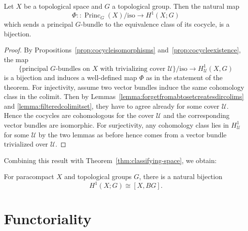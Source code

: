 \documentclass[a4paper,openany]{scrbook}
\DeclareMathOperator{\Princ}{Princ}
\begin{document}
\begin{thm}\label{thm:principalbundlesbycechcohomology}
Let $X$ be a topological space and $G$ a topological group. Then the natural map
\[
\Phi\colon\colon \Princ_G(X)/\text{iso} \to H^1(X;G)
\]
which sends a principal $G$-bundle to the equivalence class of its cocycle, is a bijection.
\end{thm}
\begin{proof}
By Propositions~\ref{prop:cocycleisomorphisms} and~\ref{prop:cocycleexistence}, the map
\[
\{\text{principal $G$-bundles on $X$ with trivializing cover $\mathcal U$}\}/\text{iso} \to H_\mathcal U^1(X,G)
\]
is a bijection and induces a well-defined map $\Phi$ as in the statement of the theorem. For injectivity, assume two vector bundles induce the same cohomology class in the colimit. Then by Lemmas~\ref{lemma:forgetfromabtosetcreatesdircolims} and \ref{lemma:filteredcolimitset}, they have to agree already for some cover $\mathcal U$. Hence the cocycles are cohomologous for the cover $\mathcal U$ and the corresponding vector bundles are isomorphic. For surjectivity, any cohomology class lies in $H^1_{\mathcal U}$ for some $\mathcal U$ by the two lemmas as before hence comes from a vector bundle trivialized over $\mathcal U$.
\end{proof}

Combining this result with Theorem~\ref{thm:classifying-space}, we obtain:

\begin{corollary}\label{cor:H1representable}
For paracompact $X$ and topological groups $G$, there is a natural bijection
\[
H^1(X;G) \cong [X,BG].
\]
\end{corollary}


\section{Functoriality}
\end{document}
